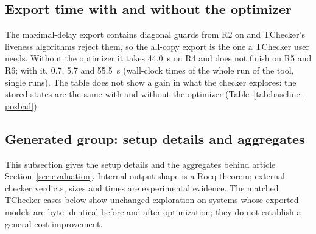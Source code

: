\subsection{Export time with and without the optimizer}
\label{sec:export-scalability}
\begin{table}[tp]
\centering
\caption{Explicit edges and export time (seconds) of the positive form of R$n$, the conjunction of $n$ bounded responses with the same bound, with the optimizer disabled ($-n\,0$) and with the default number of rounds, for both export policies. One run each of the current build under WSL~2 with a limit of 300~s; a dash is a run that did not finish within the limit. Results: .}
\label{tab:export-scalability}
\small

\end{table}
The maximal-delay export contains diagonal guards from R2 on and TChecker's liveness algorithms reject them, so the all-copy export is the one a TChecker user needs. Without the optimizer it takes 44.0~s on R4 and does not finish on R5 and R6; with it, 0.7, 5.7 and 55.5~s (wall-clock times of the whole run of the tool, single runs). The table does not show a gain in what the checker explores: the stored states are the same with and without the optimizer (Table~\ref{tab:baseline-posbad}).

\subsection{Generated group: setup details and aggregates}
This subsection gives the setup details and the aggregates behind article Section~\ref{sec:evaluation}. Internal output shape is a Rocq theorem; external checker verdicts, sizes and times are experimental evidence. The matched TChecker cases below show unchanged exploration on systems whose exported models are byte-identical before and after optimization; they do not establish a general cost improvement.

